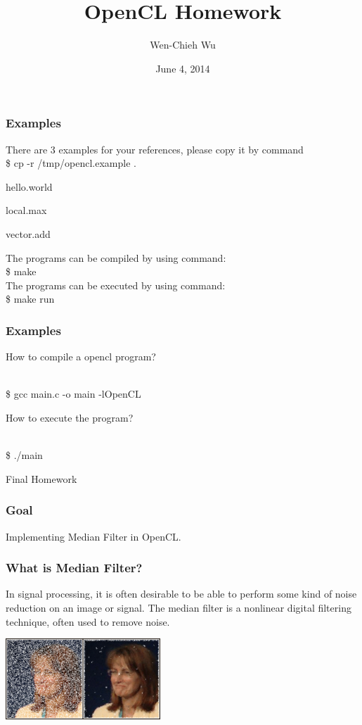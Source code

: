 \documentclass[12pt]{beamer}
\title{OpenCL  Homework}
\author{Wen-Chieh Wu}
\date{June 4, 2014}
\begin{document}
\maketitle

\begin{frame}
  \frametitle{Examples}
  There are 3 examples for your references, please copy it by command\\
  \$ cp -r /tmp/opencl.example .
  \begin{itemize}
    {\item hello.world}
    {\item local.max}
    {\item vector.add}
  \end{itemize}
  The programs can be compiled by using command:\\
  \$ make\\
  The programs can be executed by using command:\\
  \$ make run
\end{frame}

\begin{frame}
  \frametitle{Examples}
  \begin{itemize}
  {\item How to compile a opencl program?}\\
  \$ gcc main.c -o main -lOpenCL
  {\item How to execute the program?}\\
  \$ ./main
  \end{itemize}
\end{frame}

\begin{frame}
  \begin{center}
    {\Large Final Homework}
  \end{center}
\end{frame}

\begin{frame}
  \frametitle{Goal}
  \begin{center}
  Implementing Median Filter in OpenCL.
  \end{center}
\end{frame}

\begin{frame}
  \frametitle{What is Median Filter?}
  In signal processing, it is often desirable to be able to perform some kind of noise reduction on an image or signal. The median filter is a nonlinear digital filtering technique, often used to remove noise. 
  \begin{center}
    \includegraphics{img/medianfilter.png}
  \end{center}
\end{frame}
\end{document}
